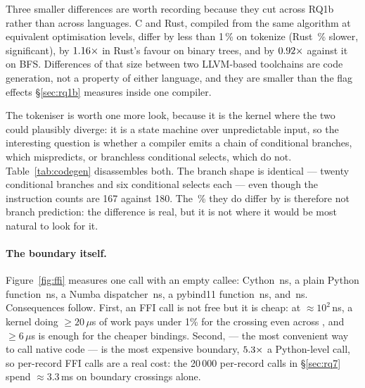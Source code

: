 Three smaller differences are worth recording because they cut across RQ1b rather than across
languages. C and Rust, compiled from the same algorithm at equivalent optimisation levels,
differ by less than 1\,\% on tokenize (Rust \,\% slower, significant), by $\meas{ratio:b2_branchy-314:binarytrees/c_ctypes|b2_branchy-314:binarytrees/rust_ctypes}{1.16}\times$ in
Rust's favour on binary trees, and by $\meas{ratio:b2_branchy-314:bfs/c_ctypes|b2_branchy-314:bfs/rust_ctypes}{0.92}\times$ against it on BFS. Differences of that size
between two LLVM-based toolchains are code generation, not a property of either language, and
they are smaller than the flag effects \S\ref{sec:rq1b} measures inside one compiler.

The tokeniser is worth one more look, because it is the kernel where the two could plausibly
diverge: it is a state machine over unpredictable input, so the interesting question is whether
a compiler emits a chain of conditional branches, which mispredicts, or branchless conditional
selects, which do not. Table~\ref{tab:codegen} disassembles both. The branch shape is identical --- twenty conditional
branches and six conditional selects each --- even though the instruction counts are 167 against
180. The \,\% they do differ by is therefore not branch prediction: the difference is real,
but it is not where it would be most natural to look for it.

\begin{table}[t]
  \centering
  \caption{RQ2: the tokeniser disassembled out of both shared libraries. The mnemonics counted
  are architecture-specific and are recorded, with the architecture, in
  .}
  \label{tab:codegen}
  \small
  
\end{table}

\paragraph{The boundary itself.} Figure~\ref{fig:ffi} measures one call with an empty
callee: Cython \,ns, a plain Python function \,ns, a Numba dispatcher \,ns, a pybind11
function \,ns, and  \,ns. Consequences follow. First, an FFI call is not free
but it is cheap: at $\approx 10^2$\,ns, a kernel doing $\ge 20\,\mu$s of work pays under 1\%
for the crossing even across , and $\ge 6\,\mu$s is enough for the cheaper bindings. Second,  --- the most convenient way to call native code ---
is the most expensive boundary, $\meas{ratio:b1_compute-314:call_overhead/c_ctypes|b1_compute-314:call_overhead/python_function}{5.3}\times$ a Python-level call, so per-record FFI calls are
a real cost: the 20\,000 per-record  calls in \S\ref{sec:rq7} spend
$\approx 3.3$\,ms on boundary crossings alone.

